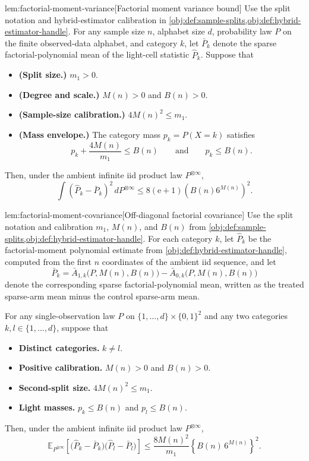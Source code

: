 \begin{lemmav}{lem:factorial-moment-variance}[Factorial moment variance bound]
Use the split notation and hybrid-estimator calibration in \cref{obj:def:sample-splits,obj:def:hybrid-estimator-handle}.  For any sample size \(n\), alphabet size \(d\), probability law \(P\) on the finite observed-data alphabet, and category \(k\), let \(\bar P_k\) denote the sparse factorial-polynomial mean of the light-cell statistic \(\widehat P_k\).  Suppose that
\begin{itemize}
\item \textbf{(Split size.)} \(m_1>0\).
\item \textbf{(Degree and scale.)} \(M(n)>0\) and \(B(n)>0\).
\item \textbf{(Sample-size calibration.)} \(4M(n)^2\le m_1\).
\item \textbf{(Mass envelope.)} The category mass \(p_k=P(X=k)\) satisfies
\[
p_k+\frac{4M(n)}{m_1}\le B(n)
\qquad\text{and}\qquad
p_k\le B(n).
\]
\end{itemize}
Then, under the ambient infinite iid product law \(P^{\otimes\infty}\),
\[
\int
\left(\widehat P_k-\bar P_k\right)^2
\,dP^{\otimes\infty}
\le
8(\mathrm e+1)\left(B(n)6^{M(n)}\right)^2 .
\]
\end{lemmav}

\begin{lemmav}{lem:factorial-moment-covariance}[Off-diagonal factorial covariance]
Use the split notation and calibration \(m_1\), \(M(n)\), and \(B(n)\) from \cref{obj:def:sample-splits,obj:def:hybrid-estimator-handle}.  For each category \(k\), let \(\widehat P_k\) be the factorial-moment polynomial estimate from \cref{obj:def:hybrid-estimator-handle}, computed from the first \(n\) coordinates of the ambient iid sequence, and let
\[
\bar P_k
=
\bar A_{1,k}\bigl(P,M(n),B(n)\bigr)
-
\bar A_{0,k}\bigl(P,M(n),B(n)\bigr)
\]
denote the corresponding sparse factorial-polynomial mean, written as the treated sparse-arm mean minus the control sparse-arm mean.

For any single-observation law \(P\) on \(\{1,\ldots,d\}\times\{0,1\}^2\) and any two categories \(k,l\in\{1,\ldots,d\}\), suppose that
\begin{itemize}
\item \textbf{Distinct categories.} \(k\ne l\).
\item \textbf{Positive calibration.} \(M(n)>0\) and \(B(n)>0\).
\item \textbf{Second-split size.} \(4M(n)^2\le m_1\).
\item \textbf{Light masses.} \(p_k\le B(n)\) and \(p_l\le B(n)\).
\end{itemize}
Then, under the ambient infinite iid product law \(P^{\otimes\infty}\),
\[
\mathbb E_{P^{\otimes\infty}}
\!\left[
\bigl(\widehat P_k-\bar P_k\bigr)
\bigl(\widehat P_l-\bar P_l\bigr)
\right]
\le
\frac{8M(n)^2}{m_1}
\left\{B(n)\,6^{M(n)}\right\}^2 .
\]
\end{lemmav}

